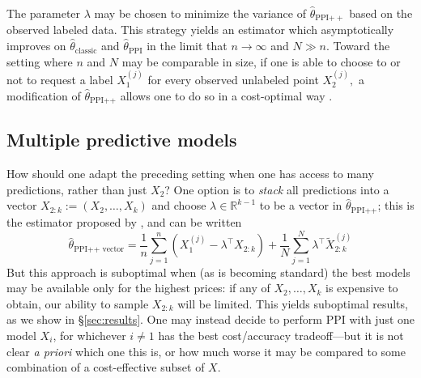 \documentclass{article} %
\newcommand{\R}{\mathbb{R}}
\renewcommand{\cite}{\citep}
\newcommand{\charlie}[1]{ {\color{red}[CCB: #1]}}
\newcommand{\amirg}[1]{ {\color{green}[AG: #1]}}
\begin{document}
The parameter $\lambda$ may be chosen to minimize the variance of $\hat{\theta}_{\text{PPI$++$}}$ based on the observed labeled data. This strategy yields an estimator which asymptotically improves on $\hat{\theta}_{\text{classic}}$ and $\hat{\theta}_{\text{PPI}}$ in the limit that $n\to\infty$ and $N\gg n$. Toward the setting where $n$ and $N$ may be comparable in size, if one is able to choose to or not to request a label $X_1^{(j)}$ for every observed unlabeled point $X_2^{(j)},$ a modification of $\hat{\theta}_{\text{PPI{++}}}$ allows one to do so in a cost-optimal way \cite{angelopoulos2025costoptimalactiveaimodel}. %

\subsection{Multiple predictive models}
\label{sec:multiple_models}
How should one adapt the preceding setting when one has access to many predictions, rather than just $X_2$? One option is to \textit{stack} all predictions into a vector $X_{2:k}:=(X_2,\dots,X_k)$ and choose $\lambda\in\R^{k-1}$ to be a vector in $\hat{\theta}_{\text{PPI++}}$; this is the estimator proposed by \citet{miao2024assumptionleandataadaptivepostpredictioninference}, and can be written
%
\begin{equation}\label{eqn:ppi++vector}
    \hat{\theta}_{\text{PPI++ vector}} = \frac{1}{n}\sum_{j=1}^n \left(X_1^{(j)} - \lambda^\top X_{2:k}\right) + \frac{1}{N}\sum_{j=1}^N \lambda^\top \tilde{X}_{2:k}^{(j)}
\end{equation}
%
But this approach is suboptimal when (as is  becoming standard) the best models may be available only for the highest prices: if any of $X_2,\dots,X_k$ is expensive to obtain, our ability to sample $X_{2:k}$ will be limited. This yields suboptimal results, as we show in \S\ref{sec:results}. One may instead decide to perform PPI with just one model $X_{i}$, for whichever $i \neq 1$ has the best cost/accuracy tradeoff---but it is not clear \textit{a priori} which one this is, or how much worse it may be compared to some combination of a cost-effective subset of $X$.
\end{document}
